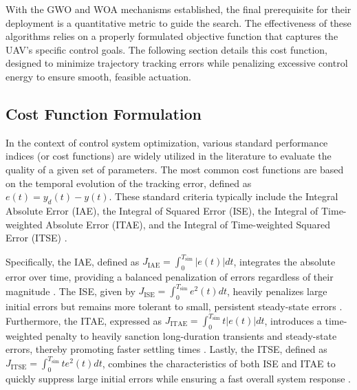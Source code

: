 With the GWO and WOA mechanisms established, the final prerequisite for their deployment is a quantitative metric to guide the search. The effectiveness of these algorithms relies on a properly formulated objective function that captures the UAV's specific control goals. The following section details this cost function, designed to minimize trajectory tracking errors while penalizing excessive control energy to ensure smooth, feasible actuation.

\subsection{Cost Function Formulation}

In the context of control system optimization, various standard performance indices (or cost functions) are widely utilized in the literature to evaluate the quality of a given set of parameters. The most common cost functions are based on the temporal evolution of the tracking error, defined as $e(t) = y_d(t) - y(t)$. These standard criteria typically include the Integral Absolute Error (IAE), the Integral of Squared Error (ISE), the Integral of Time-weighted Absolute Error (ITAE), and the Integral of Time-weighted Squared Error (ITSE) \cite{ogata2010modern, astrom2006advanced}. 

Specifically, the IAE, defined as $J_{\text{IAE}} = \int_{0}^{T_{\text{sim}}} |e(t)| dt$, integrates the absolute error over time, providing a balanced penalization of errors regardless of their magnitude \cite{iae_ref}. The ISE, given by $J_{\text{ISE}} = \int_{0}^{T_{\text{sim}}} e^2(t) dt$, heavily penalizes large initial errors but remains more tolerant to small, persistent steady-state errors \cite{ise_ref}. Furthermore, the ITAE, expressed as $J_{\text{ITAE}} = \int_{0}^{T_{\text{sim}}} t |e(t)| dt$, introduces a time-weighted penalty to heavily sanction long-duration transients and steady-state errors, thereby promoting faster settling times \cite{itae_ref}. Lastly, the ITSE, defined as $J_{\text{ITSE}} = \int_{0}^{T_{\text{sim}}} t e^2(t) dt$, combines the characteristics of both ISE and ITAE to quickly suppress large initial errors while ensuring a fast overall system response \cite{itse_ref}.

